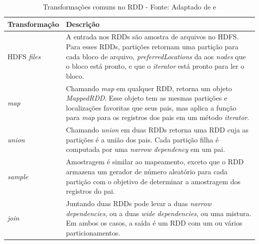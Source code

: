             \begin{table}[!ht]
            \begin{center}
              \begin{tabular}{|p{5cm}|p{8cm}|}
                \hline
                Transformação & Descrição
                \\ \hline
                HDFS \textit{files} & A entrada nos RDDs são amostra de arquivos no HDFS.  Para esses RDDs, partições retornam
                                                   uma partição para cada bloco de arquivo, \textit{preferredLocations} da aos \textit{nodes}
                                                   que o bloco está pronto, e que o \textit{iterator} está pronto para ler o bloco.
                \\ \hline
                \textit{map} & Chamando \textit{map} em qualquer RDD, retorna um objeto \textit{MappedRDD}. Esse objeto tem
                                          as mesmas partições e localizações favoritas que seus pais, mas aplica a função para \textit{map}
                                          para os registros dos pais em um método \textit{iterator}.
                \\ \hline
                \textit{union} & Chamando \textit{union} em duas RDDs retorna uma RDD cuja as partições é a união dos pais.
                                            Cada partição filha é computada por uma \textit{narrow dependency} em um pai.
                \\ \hline
                \textit{sample} & Amostragem é similar ao mapeamento, exceto que o RDD armazena um gerador de número
                                              aleatório para cada partição com o objetivo de determinar a amostragem dos registros do pai.
                \\ \hline
                \textit{join} & Juntando duas RDDs pode levar a duas \textit{narrow dependencies}, ou a duas \textit{wide dependencies},
                                        ou uma mistura. Em ambos os casos, a saída é um RDD com um ou vários particionamentos.
                \\ \hline
              \end{tabular}
              \caption[Transformações comuns no RDD]{Transformações comuns no RDD -
              \protect Fonte: Adaptado de  e }
            \label{tabela2}
            \end{center}
            \end{table}

